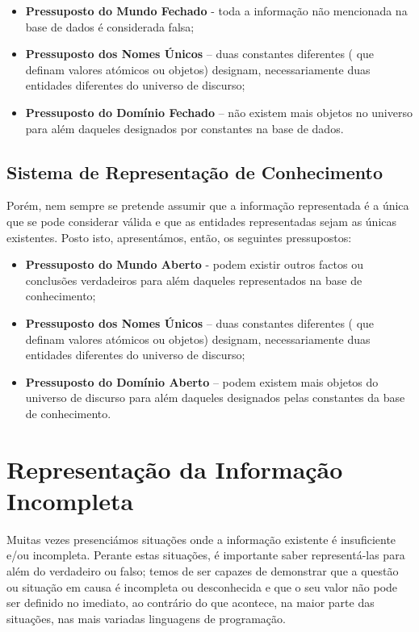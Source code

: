 \begin{itemize}
	\item \textbf{Pressuposto do Mundo Fechado} - toda a informação não mencionada na base de dados é considerada falsa;
	\item \textbf{Pressuposto dos Nomes Únicos} – duas constantes diferentes ( que definam valores atómicos ou objetos) designam, necessariamente duas entidades diferentes do universo de discurso; 
	\item \textbf{Pressuposto do Domínio Fechado} – não existem mais objetos no universo para além daqueles designados por constantes na base de dados.  
\end{itemize}


\subsection{Sistema de Representação de Conhecimento}

Porém, nem sempre se pretende assumir que a informação representada é a única que se pode considerar válida e que as entidades representadas sejam as únicas existentes. Posto isto, apresentámos, então, os seguintes pressupostos:

\begin{itemize}
	\item \textbf{Pressuposto do Mundo Aberto} - podem existir outros factos ou conclusões verdadeiros para além daqueles representados na base de conhecimento; 
	\item \textbf{Pressuposto dos Nomes Únicos} – duas constantes diferentes ( que definam valores atómicos ou objetos) designam, necessariamente duas entidades diferentes do universo de discurso; 
	\item \textbf{Pressuposto do Domínio Aberto} – podem existem mais objetos do universo de discurso para além daqueles designados pelas constantes da base de conhecimento.  
\end{itemize}

\section{Representação da Informação Incompleta}


Muitas vezes presenciámos situações onde a informação existente é insuficiente e/ou incompleta. Perante estas situações, é importante saber representá-las para além do verdadeiro ou falso; temos de ser capazes de demonstrar que a questão ou situação em causa é incompleta ou desconhecida e que o seu valor não pode ser definido no imediato, ao contrário do que acontece, na maior parte das situações, nas mais variadas linguagens de programação.


